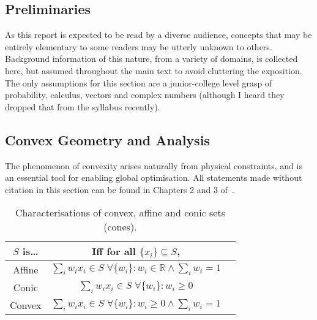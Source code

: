 \documentclass[10pt, a4paper]{article}
\numberwithin{equation}{section} %
\theoremstyle{definition}
\theoremstyle{plain}
\newenvironment{Tabular}[1] %
{\def\arraystretch{1.75}\begin{tabular}{#1}}
{\end{tabular}}
\newcommand{\?}{\mathrel{?}} %
\newcommand{\R}{\mathbb{R}} %
\begin{document}
                  \begin{appendices}

                    \section{Preliminaries}\label{sec:prelim}

                    As this report is expected to be read by a diverse audience, concepts that may be entirely elementary to some readers may be utterly unknown to others. Background information of this nature, from a variety of domains, is collected here, but assumed throughout the main text to avoid cluttering the exposition. The only assumptions for this section are a junior-college level grasp of probability, calculus, vectors and complex numbers (although I heard they dropped that from the syllabus recently).

                    \subsection{Convex Geometry and Analysis}\label{sec:prelim_cvxgeom}

                    The phenomenon of convexity arises naturally from physical constraints, and is an essential tool for enabling global optimisation. All statements made without citation in this section can be found in Chapters 2 and 3 of~\cite{BoydVand}.

                    \begin{table}[H]
                      \centering
                      \begin{Tabular}{ccl} 
                        \toprule
                        \(S\) is\ldots & Iff for all \(\{x_i\} \subseteq S\), \\
                        \midrule
                        Affine & \(\sum_i w_i x_i \in S\;\forall \{w_i\} : w_i \in \R \land \sum_i w_i = 1 \)  \\
                        Conic & \(\sum_i w_i x_i \in S\;\forall \{w_i\} : w_i \geq 0\)  \\
                        Convex & \(\sum_i w_i x_i \in S\;\forall \{w_i\} : w_i \geq 0 \land \sum_i w_i = 1 \)  \\
                        \bottomrule
                      \end{Tabular}
                      \caption{Characterisations of convex, affine and conic sets (cones).}\label{tab:sets}
                    \end{table}


\end{appendices}
\end{document}
